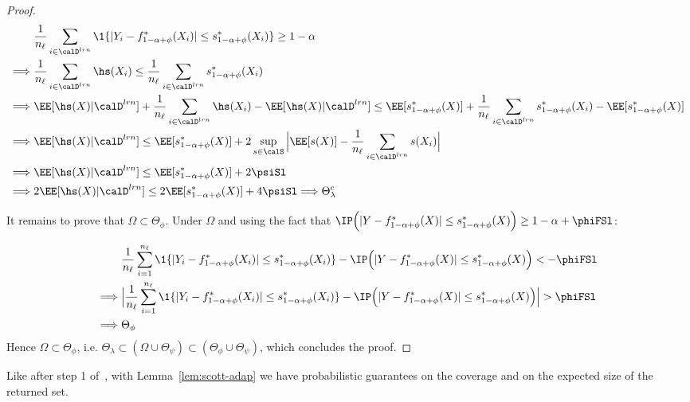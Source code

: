 \begin{proof}
\begin{align*}
    &\frac{1}{n_\ell}\sum_{i\in\calD^{lrn}}\1\{|Y_i-f_{1-\alpha+\phi}^*(X_i)|\leq s_{1-\alpha+\phi}^*(X_i)\} \geq 1-\alpha \\
    \Longrightarrow\hspace{0.1cm} & \frac{1}{n_\ell}\sum_{i\in\calD^{lrn}}\hs(X_i) \leq \frac{1}{n_\ell}\sum_{i\in\calD^{lrn}}s_{1-\alpha+\phi}^*(X_i) \\
    \Longrightarrow\hspace{0.1cm} & \EE[\hs(X)|\calD^{lrn}]+\frac{1}{n_\ell}  \sum_{i\in\calD^{lrn}}\hs(X_i) - \EE[\hs(X)|\calD^{lrn}] \leq \EE[s_{1-\alpha+\phi}^*(X)] + \frac{1}{n_\ell}\sum_{i\in\calD^{lrn}}s_{1-\alpha+\phi}^*(X_i) -  \EE[s_{1-\alpha+\phi}^*(X)]\\
    \Longrightarrow\hspace{0.1cm} & \EE[\hs(X)|\calD^{lrn}] \leq \EE[s_{1-\alpha+\phi}^*(X)] + 2\sup_{s\in\calS}\Big|\EE[s(X)] - \frac{1}{n_\ell}\sum_{i\in\calD^{lrn}} s(X_i)\Big| \\
    \Longrightarrow\hspace{0.1cm} & \EE[\hs(X)|\calD^{lrn}] \leq \EE[s_{1-\alpha+\phi}^*(X)] + 2\psiSl\\
    \Longrightarrow\hspace{0.1cm} & 2\EE[\hs(X)|\calD^{lrn}] \leq 2\EE[s_{1-\alpha+\phi}^*(X)] + 4\psiSl\Longrightarrow \Theta_\lambda^c
\end{align*}

It remains to prove that $\Omega \subset \Theta_\phi$. Under $\Omega$ and using the fact that $\IP\Big(|Y-f^*_{1-\alpha+\phi}(X)|\leq s^*_{1-\alpha+\phi}(X)\Big)\geq 1- \alpha + \phiFSl$: 

    \begin{align*}
        &\frac{1}{n_\ell}\sum_{i=1}^{n_\ell}\1\{|Y_i-f^*_{1-\alpha+\phi}(X_i)|\leq s^*_{1-\alpha+\phi}(X_i)\} - \IP\Big(|Y-f^*_{1-\alpha+\phi}(X)|\leq s^*_{1-\alpha+\phi}(X)\Big) < - \phiFSl \\
        \Longrightarrow \hspace{0.1cm}& \Big|\frac{1}{n_\ell}\sum_{i=1}^{n_\ell}\1\{|Y_i-f^*_{1-\alpha+\phi}(X_i)|\leq s^*_{1-\alpha+\phi}(X_i)\} - \IP\Big(|Y-f^*_{1-\alpha+\phi}(X)|\leq s^*_{1-\alpha+\phi}(X)\Big)\Big| > \phiFSl \\
        \Longrightarrow \hspace{0.1cm}& \Theta_\phi
    \end{align*}
    Hence $\Omega \subset \Theta_\phi$, i.e. $\Theta_\lambda\subset (\Omega \cup \Theta_\psi)\subset (\Theta_\phi \cup \Theta_\psi)$, which concludes the proof.
\end{proof}

Like after step 1 of~\method, with Lemma~\ref{lem:scott-adap} we have probabilistic guarantees on the coverage and on the expected size of the returned set. 
